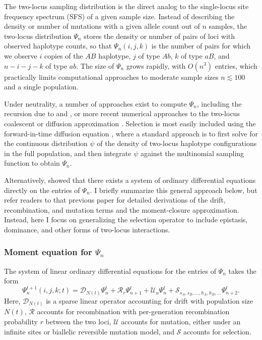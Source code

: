 \documentclass[]{article}
\begin{document}
The two-locus sampling distribution is the direct analog to the single-locus
site frequency spectrum (SFS) of a given sample size. Instead of describing the
density or number of mutations with a given allele count out of \(n\) samples,
the two-locus distribution \(\Psi_n\) stores the density or number of pairs of
loci with observed haplotype counts, so that \(\Psi_n(i, j, k)\) is the number
of pairs for which we observe \(i\) copies of the \(AB\) haplotype, \(j\) of
type \(Ab\), \(k\) of type \(aB\), and \(n-i-j-k\) of type \(ab\). The size of
\(\Psi_n\) grows rapidly, with \(O(n^3)\) entries, which practically limits
computational approaches to moderate sample sizes \(n\lesssim 100\) and a
single population.

Under neutrality, a number of approaches exist to compute \(\Psi_n\), including
the recursion due to \citet{Golding1984-pu} and \citet{Ethier1990-tb}, or more
recent numerical approaches to the two-locus coalescent \citep{Kamm2016-ag} or
diffusion approximation \citep{Ragsdale2017-gg}. Selection is most easily
included using the forward-in-time diffusion equation
\citep{Kimura1955-qe,Hill1966-gv}, where a standard approach is to first solve
for the continuous distribution \(\psi\) of the density of two-locus haplotype
configurations in the full population, and then integrate \(\psi\) against the
multinomial sampling function to obtain \(\Psi_n\).

Alternatively, \citet{Ragsdale2019-nt} showed that there exists a system of
ordinary differential equations directly on the entries of \(\Psi_n\). I
briefly summarize this general approach below, but refer readers to that
previous paper for detailed derivations of the drift, recombination, and
mutation terms and the moment-closure approximation. Instead, here I focus on
generalizing the selection operator to include epistasis, dominance, and other
forms of two-locus interactions.

\subsubsection{Moment equation for \(\Psi_n\)}

The system of linear ordinary differential equations for the entries of
\(\Psi_n\) takes the form
\begin{equation}
\label{eq:system}
{\Psi}_n^{t+1}(i, j, k; t) =
\mathcal{D}_{N(t)}\Psi_n^t
+ \mathcal{R}_{r}\Psi_{n+1}^t
+ \mathcal{U}_{u}\Psi_n^t
+ \mathcal{S}_{s_A, s_B, \ldots, h_A, h_B, \ldots}\Psi_{n+2}^t.
\end{equation}
Here, \(\mathcal{D}_{N(t)}\) is a sparse linear operator accounting for drift
with population size \(N(t)\), \(\mathcal{R}\) accounts for recombination
with per-generation recombination probability \(r\) between the two loci,
\(\mathcal{U}\) accounts for mutation, either under an infinite sites or
biallelic reversible mutation model, and \(\mathcal{S}\) accounts for
selection.
\end{document}
